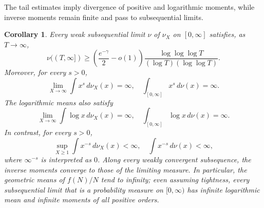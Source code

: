\documentclass[11pt,letterpaper,reqno]{amsart}
\numberwithin{equation}{section}
\newtheorem{corollary}[theorem]{Corollary}
\theoremstyle{remark}
\renewcommand{\geq}{\geqslant}
\begin{document}
The tail estimates imply divergence of positive and logarithmic moments, while inverse moments remain finite and pass to subsequential limits.

\begin{corollary}
Every weak subsequential limit $\nu$ of $\nu_X$ on $[0,\infty]$ satisfies, as
$T\to\infty$,
\begin{equation}
\label{eq:dadd:subsequential-tail}
 \nu((T,\infty])
 \geq\left(\frac{e^{-\gamma}}2-o(1)\right)
 \frac{\log\log\log T}{(\log T)(\log\log T)}.
\end{equation}
Moreover, for every $s>0$,
\[
 \lim_{X\to\infty}\int x^s\,d\nu_X(x)=\infty,
 \quad
 \int_{[0,\infty]}x^s\,d\nu(x)=\infty.
\]
The logarithmic means also satisfy
\[
 \lim_{X\to\infty}\int\log x\,d\nu_X(x)=\infty,
 \quad
 \int_{[0,\infty]}\log x\,d\nu(x)=\infty.
\]
In contrast, for every $s>0$,
\[
 \sup_{X\geq1}\int x^{-s}\,d\nu_X(x)<\infty,
 \quad
 \int x^{-s}\,d\nu(x)<\infty,
\]
where $\infty^{-s}$ is interpreted as $0$. Along every weakly convergent subsequence,
the inverse moments converge to those of the limiting measure.
In particular, the geometric means of $f(N)/N$ tend to infinity;
even assuming tightness, every subsequential limit that is a probability
measure on $[0,\infty)$ has
infinite logarithmic mean and infinite moments of all positive orders.
\end{corollary}
\end{document}
